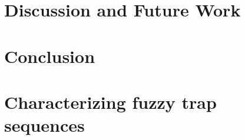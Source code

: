 \documentclass[twocolumn,10pt]{article}
\begin{document}
\section{Discussion and Future Work}

\label{sec:discussion}

\section{Conclusion}

\label{sec:conclusion}




\onecolumn
\newpage
\appendix

\section{Characterizing fuzzy trap sequences}
\label{app:fuzzy_trap_sequences}
 
\end{document}
